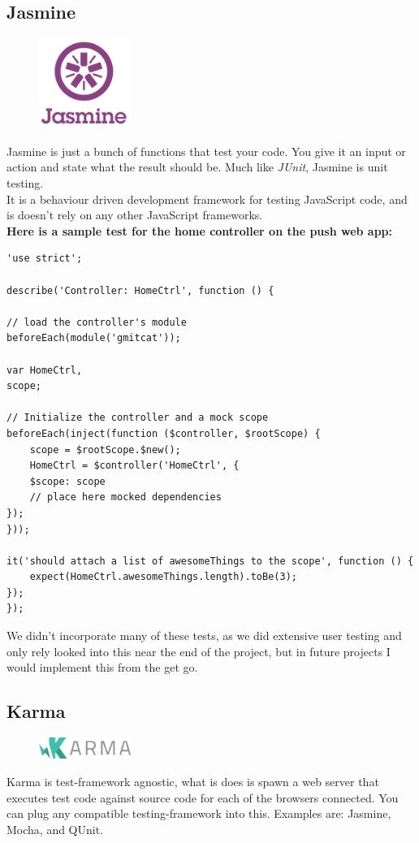 \subsection{Jasmine}
\begin{figure}
\includegraphics[width=3cm]{img/mobile-app/logos/jasmine.png}
\end{figure} 
\cite{jasmine}
Jasmine is just a bunch of functions that test your code.
You give it an input or action and state what the result should be.
Much like \textit{JUnit}, Jasmine is unit testing.
\\

It is a behaviour driven development framework for testing JavaScript code, and is doesn't rely on any other JavaScript frameworks.
\\ 

\textbf{Here is a sample test for the home controller on the push web app:}
  \begin{verbatim}
'use strict';

describe('Controller: HomeCtrl', function () {

// load the controller's module
beforeEach(module('gmitcat'));

var HomeCtrl,
scope;

// Initialize the controller and a mock scope
beforeEach(inject(function ($controller, $rootScope) {
    scope = $rootScope.$new();
    HomeCtrl = $controller('HomeCtrl', {
    $scope: scope
    // place here mocked dependencies
});
}));

it('should attach a list of awesomeThings to the scope', function () {
    expect(HomeCtrl.awesomeThings.length).toBe(3);
});
});
\end{verbatim}

We didn't incorporate many of these tests, as we did extensive user testing and only rely looked into this near the end of the project, but in future projects I would implement this from the get go.

\subsection{Karma}
\begin{figure}
\includegraphics[width=3cm]{img/mobile-app/logos/karma.png}
\end{figure} 
\cite{karma}
Karma is test-framework agnostic, what is does is spawn a web server that executes test code against source code for each of the browsers connected. You can plug any compatible testing-framework into this. Examples are: Jasmine, Mocha, and QUnit.

